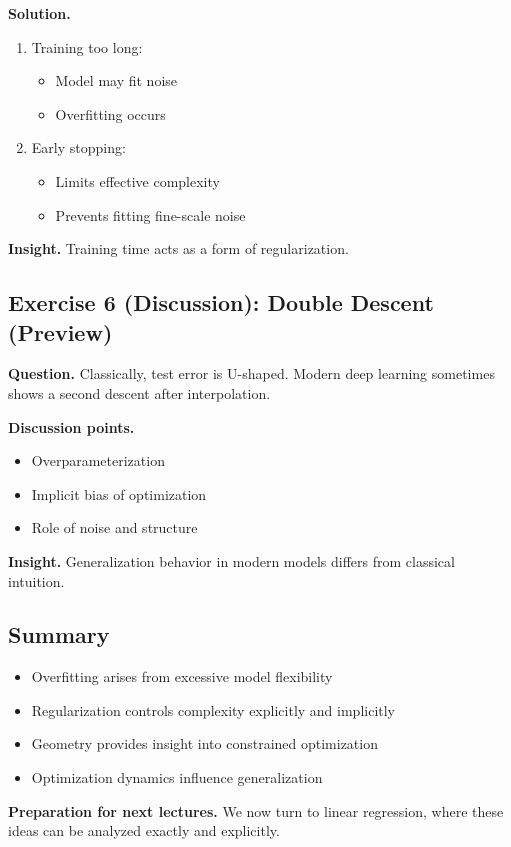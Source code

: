 \noindent
\textbf{Solution.}

\begin{enumerate}
\item Training too long:
\begin{itemize}
    \item Model may fit noise
    \item Overfitting occurs
\end{itemize}

\item Early stopping:
\begin{itemize}
    \item Limits effective complexity
    \item Prevents fitting fine-scale noise
\end{itemize}
\end{enumerate}

\medskip

\noindent
\textbf{Insight.}  
Training time acts as a form of regularization.

\subsection{Exercise 6 (Discussion): Double Descent (Preview)}

\textbf{Question.}  
Classically, test error is U-shaped. Modern deep learning sometimes shows a second descent after interpolation.

\medskip

\noindent
\textbf{Discussion points.}
\begin{itemize}
    \item Overparameterization
    \item Implicit bias of optimization
    \item Role of noise and structure
\end{itemize}

\medskip

\noindent
\textbf{Insight.}  
Generalization behavior in modern models differs from classical intuition.

\subsection{Summary}

\begin{itemize}
    \item Overfitting arises from excessive model flexibility
    \item Regularization controls complexity explicitly and implicitly
    \item Geometry provides insight into constrained optimization
    \item Optimization dynamics influence generalization
\end{itemize}

\medskip

\noindent
\textbf{Preparation for next lectures.}  
We now turn to linear regression, where these ideas can be analyzed exactly and explicitly.